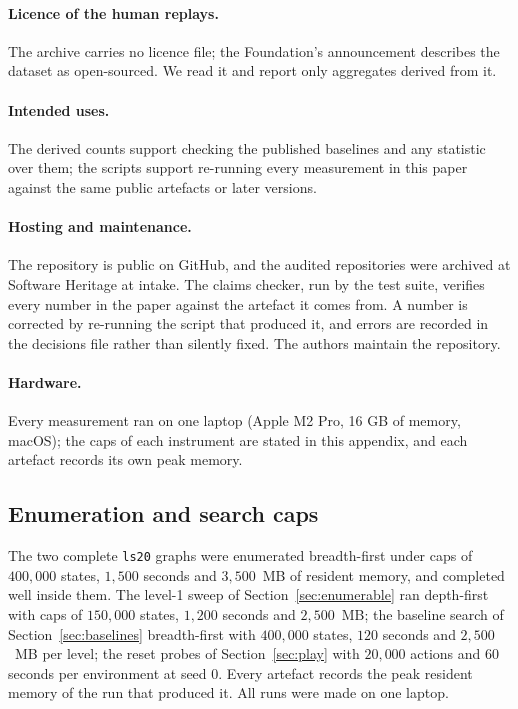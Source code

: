 \documentclass[11pt]{article}
\newcommand{\code}[1]{\texttt{#1}}
\begin{document}
\paragraph{Licence of the human replays.} The archive carries no licence file;
the Foundation's announcement describes the dataset as open-sourced. We read it
and report only aggregates derived from it.

\paragraph{Intended uses.} The derived counts support checking the published
baselines and any statistic over them; the scripts support re-running every
measurement in this paper against the same public artefacts or later versions.

\paragraph{Hosting and maintenance.} The repository is public on GitHub, and the
audited repositories were archived at Software Heritage at intake. The claims
checker, run by the test suite, verifies every number in the paper against the
artefact it comes from. A number
is corrected by re-running the script that produced it, and errors are recorded
in the decisions file rather than silently fixed. The authors maintain the
repository.

\paragraph{Hardware.} Every measurement ran on one laptop (Apple M2 Pro, 16 GB of
memory, macOS); the caps of each instrument are stated in this appendix, and
each artefact records its own peak memory.

\subsection{Enumeration and search caps}
\label{sec:caps}

The two complete \code{ls20} graphs were enumerated breadth-first under caps of
$400{,}000$ states, $1{,}500$ seconds and $3{,}500$~MB of resident memory, and
completed well inside them. The level-1 sweep of Section~\ref{sec:enumerable} ran
depth-first with caps of $150{,}000$ states, $1{,}200$ seconds and $2{,}500$~MB;
the baseline search of Section~\ref{sec:baselines} breadth-first with $400{,}000$
states, $120$ seconds and $2{,}500$~MB per level; the reset probes of
Section~\ref{sec:play} with $20{,}000$ actions and $60$ seconds per environment at seed
$0$. Every artefact records the peak resident memory of the run that produced
it. All runs were made on one laptop.
\end{document}
